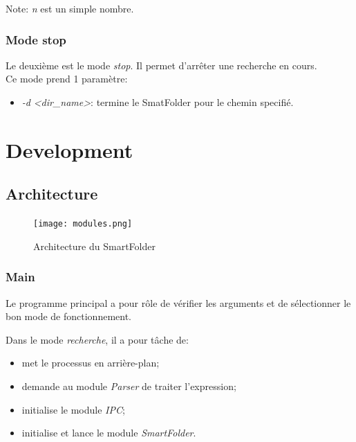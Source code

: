 \documentclass[11pt, a4paper]{article}
\begin{document}
Note: \textit{n} est un simple nombre.

\subsubsection{Mode stop}
Le deuxième est le mode \textit{stop}.
Il permet d'arrêter une recherche en cours. \\

Ce mode prend 1 paramètre:
\begin{itemize}
    \item \textit{-d} \textit{<dir\_name>}: termine le SmatFolder pour le chemin specifié.
\end{itemize}

\newpage

\section{Development}
\subsection{Architecture}

\begin{figure}[H]
    \begin{center}
        \texttt{[image: modules.png]}
    \end{center}
    \caption{Architecture du SmartFolder}
    \label{Architecture du SmartFolder}
\end{figure}

\subsubsection{Main}

Le programme principal a pour rôle de vérifier les arguments et de sélectionner le bon mode de fonctionnement.

Dans le mode \textit{recherche}, il a pour tâche de:
\begin{itemize}
    \item met le processus en arrière-plan;
    \item demande au module \textit{Parser} de traiter l'expression;
    \item initialise le module \textit{IPC};
    \item initialise et lance le module \textit{SmartFolder}.\\
\end{itemize}
\end{document}
